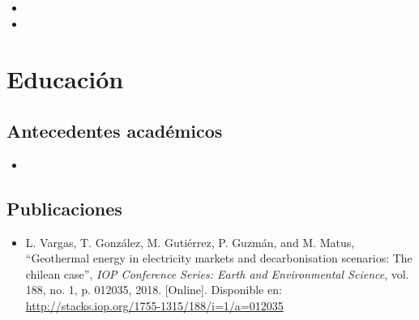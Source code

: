 \documentclass[11pt,a4paper,sans]{moderncv}        %
\begin{document}
\begin{itemize}
\vspace{6pt}

\item{}

\vspace{6pt}

\item{}

\end{itemize}

\section{Educación}

\vspace{5pt}

\subsection{Antecedentes académicos}

\vspace{5pt}

\begin{itemize}

\item{}

\vspace{6pt}


\end{itemize}

\vspace{2pt}

\subsection{Publicaciones}

\begin{itemize}

\item{
L. Vargas, T. González, M. Gutiérrez, P. Guzmán, and M. Matus, “Geothermal energy in electricity markets and decarbonisation scenarios: The chilean case”, {\em IOP Conference Series: Earth and Environmental Science}, vol. 188, no. 1, p. 012035, 2018. [Online]. Disponible en: \url{http://stacks.iop.org/1755-1315/188/i=1/a=012035}
\\ }
\end{itemize}
\end{document}
